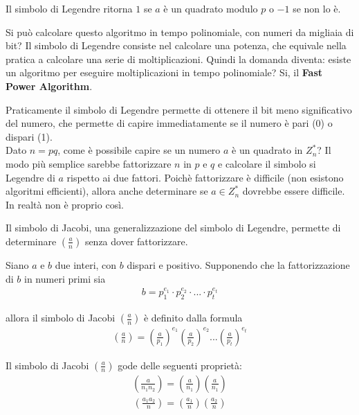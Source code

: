 \noindent Il simbolo di Legendre ritorna $1$ se $a$ è un quadrato modulo $p$ o $-1$ se non lo è. 

Si può calcolare questo algoritmo in tempo polinomiale, con numeri da migliaia di bit? Il simbolo di Legendre consiste nel calcolare una potenza, che equivale nella pratica a calcolare una serie di moltiplicazioni. Quindi la domanda diventa: esiste un algoritmo per eseguire moltiplicazioni in tempo polinomiale? Si, il \textbf{Fast Power Algorithm}. 

Praticamente il simbolo di Legendre permette di ottenere il bit meno significativo del numero, che permette di capire immediatamente se il numero è pari (0) o dispari (1).\\

\noindent Dato $n=pq$, come è possibile capire se un numero $a$ è un quadrato in $Z_n^*$? Il modo più semplice sarebbe fattorizzare $n$ in $p$ e $q$ e calcolare il simbolo si Legendre di $a$ rispetto ai due fattori. Poichè fattorizzare è difficile (non esistono algoritmi efficienti), allora anche determinare se $a \in Z_n^*$ dovrebbe essere difficile. In realtà non è proprio così. 

Il simbolo di Jacobi, una generalizzazione del simbolo di Legendre, permette di determinare $\left(\frac{a}{n} \right)$ senza dover fattorizzare.
\begin{definition} Siano \(a\) e \(b\) due interi, con \(b\) dispari e positivo. Supponendo che la fattorizzazione di \(b\) in numeri primi sia 
\begin{align*}
    b = p_1^{e_1} \cdot p_2^{e_2} \cdot ... \cdot p_t^{e_t}
\end{align*}

\noindent allora il simbolo di Jacobi \(\left(\frac{a}{n}\right)\) è definito dalla formula 
\begin{align*}
    \left(\frac{a}{n}\right) = \left(\frac{a}{p_1}\right)^{e_1} \left(\frac{a}{p_2}\right)^{e_2} ... \left(\frac{a}{p_t}\right)^{e_t}
\end{align*}
\end{definition}

\noindent Il simbolo di Jacobi $\left(\frac{a}{n}\right)$ gode delle seguenti proprietà:
\begin{align*}
    \left(\frac{a}{n_1n_2}\right) = \left(\frac{a}{n_1}\right)\left(\frac{a}{n_1}\right)
\end{align*}
\begin{align*}
        \left(\frac{a_1a_2}{n}\right) = \left(\frac{a_1}{n}\right)\left(\frac{a_2}{n}\right)
\end{align*}

